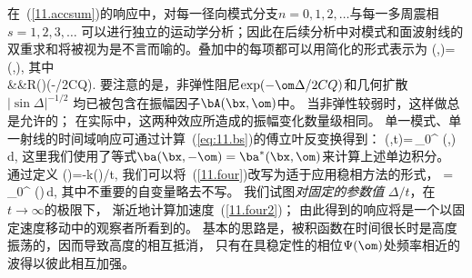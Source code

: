 在~(\ref{11.accsum})的响应中，对每一径向模式分支$n=0,1,2,\ldots$与每一多周震相$s=1,2,3,\ldots$ 可以进行独立的运动学分析；因此在后续分析中对模式和面波射线的双重求和将被视为是不言而喻的。叠加中的每项都可以用简化的形式表示为
\eq
\ba(\bx,\om)=\bA(\bx,\om)\exp[-ik(\om)\Delta],
\label{eq:11.bs}
\en
其中
\eqa
{} \nonumber \\
&&\mbox{}\times R(\Phi)\exp [i(s-1)
\pi/2]\exp(-\om\Delta/2CQ). \label{11.ampdef}
\ena
要注意的是，非弹性阻尼$\exp(-\om\Delta/2CQ)$和几何扩散$|\sin\Delta|^{-1/2}$
均已被包含在振幅因子$\bA(\bx,\om)$中。
当非弹性较弱时，这样做总是允许的；
在实际中，这两种效应所造成的振幅变化数量级相同。
单一模式、单一射线的时间域响应可通过计算~(\ref{eq:11.bs})的傅立叶反变换得到：
\eq \label{11.four}
\ba(\bx,t)=\,\!\int_{0}^\infty
\bA(\bx,\om)\,d\om,
\en
这里我们使用了等式$\ba(\bx,-\om)=\ba^*(\bx,\om)$来计算上述单边积分。
通过定义
\eq
\Psi(\om)=\om-k(\om)\Delta/t,
\en
我们可以将~(\ref{11.four})改写为适于应用稳相方法的形式，
\eq
\ba=\,\!\int_{0}^\infty
\bA(\om)\exp[it\Psi(\om)]\,d\om,
\label{11.four2}
\en
其中不重要的自变量略去不写。
我们试图{\em 对固定的参数值\/} $\Delta/t$，在$t\rightarrow\infty$的极限下，
渐近地计算加速度~(\ref{11.four2})；
由此得到的响应将是一个以固定速度移动中的观察者所看到的。
基本的思路是，被积函数在时间很长时是高度振荡的，因而导致高度的相互抵消，
只有在具稳定性的相位$\Psi(\om)$处频率相近的波得以彼此相互加强。

